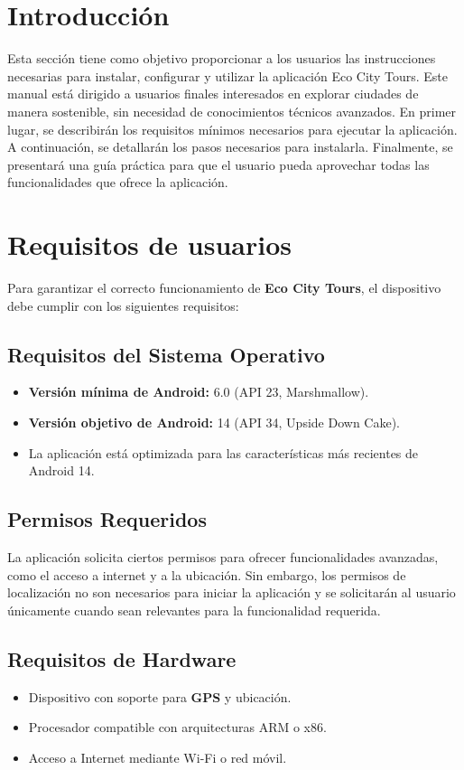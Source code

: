 
\section{Introducción}
Esta sección tiene como objetivo proporcionar a los usuarios las instrucciones necesarias para instalar, configurar y utilizar la aplicación Eco City Tours. Este manual está dirigido a usuarios finales interesados en explorar ciudades de manera sostenible, sin necesidad de conocimientos técnicos avanzados.
En primer lugar, se describirán los requisitos mínimos necesarios para ejecutar la aplicación. A continuación, se detallarán los pasos necesarios para instalarla. Finalmente, se presentará una guía práctica para que el usuario pueda aprovechar todas las funcionalidades que ofrece la aplicación.
\section{Requisitos de usuarios}
Para garantizar el correcto funcionamiento de \textbf{Eco City Tours}, el dispositivo debe cumplir con los siguientes requisitos:

\subsection*{Requisitos del Sistema Operativo}
\begin{itemize}
	\item \textbf{Versión mínima de Android:} 6.0 (API 23, Marshmallow).
	\item \textbf{Versión objetivo de Android:} 14 (API 34, Upside Down Cake).
	\item La aplicación está optimizada para las características más recientes de Android 14.
\end{itemize}

\subsection*{Permisos Requeridos}
La aplicación solicita ciertos permisos para ofrecer funcionalidades avanzadas, como el acceso a internet y a la ubicación. Sin embargo, los permisos de localización no son necesarios para iniciar la aplicación y se solicitarán al usuario únicamente cuando sean relevantes para la funcionalidad requerida.

\subsection*{Requisitos de Hardware}
\begin{itemize}
	\item Dispositivo con soporte para \textbf{GPS} y ubicación.
	\item Procesador compatible con arquitecturas ARM o x86.
	\item Acceso a Internet mediante Wi-Fi o red móvil.
\end{itemize}


